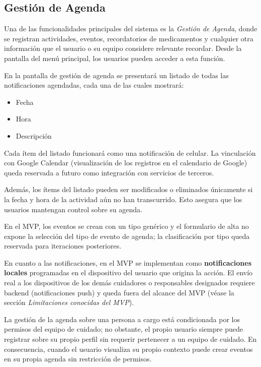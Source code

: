 \documentclass[a4paper,12pt]{article}
\begin{document}
    \subsection{Gestión de Agenda}
    \par Una de las funcionalidades principales del sistema es la \textit{Gestión de Agenda}, donde se registran actividades, eventos, recordatorios de medicamentos y cualquier otra información que el usuario o su equipo considere relevante recordar. Desde la pantalla del menú principal, los usuarios pueden acceder a esta función.
    \par En la pantalla de gestión de agenda se presentará un listado de todas las notificaciones agendadas, cada una de las cuales mostrará:
    \begin{itemize}
        \item Fecha
        \item Hora
        \item Descripción
    \end{itemize}
    \par Cada ítem del listado funcionará como una notificación de celular. La vinculación con Google Calendar (visualización de los registros en el calendario de Google) queda reservada a futuro como integración con servicios de terceros.
    \par Además, los ítems del listado pueden ser modificados o eliminados únicamente si la fecha y hora de la actividad aún no han transcurrido. Esto asegura que los usuarios mantengan control sobre su agenda.
    \par En el MVP, los eventos se crean con un tipo genérico y el formulario de alta no expone la selección del tipo de evento de agenda; la clasificación por tipo queda reservada para iteraciones posteriores.
    \par En cuanto a las notificaciones, en el MVP se implementan como \textbf{notificaciones locales} programadas en el dispositivo del usuario que origina la acción. El envío real a los dispositivos de los demás cuidadores o responsables designados requiere backend (notificaciones push) y queda fuera del alcance del MVP (véase la sección \textit{Limitaciones conocidas del MVP}).
    \par La gestión de la agenda sobre una persona a cargo está condicionada por los permisos del equipo de cuidado; no obstante, el propio usuario siempre puede registrar sobre su propio perfil sin requerir pertenecer a un equipo de cuidado. En consecuencia, cuando el usuario visualiza su propio contexto puede crear eventos en su propia agenda sin restricción de permisos.
\end{document}
